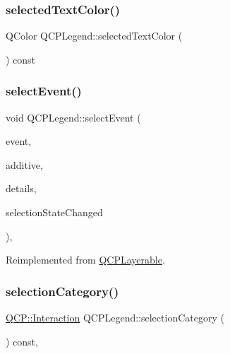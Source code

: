 \subsubsection{\texorpdfstring{selectedTextColor()}{selectedTextColor()}}
{\footnotesize\ttfamily Q\+Color Q\+C\+P\+Legend\+::selected\+Text\+Color (\begin{DoxyParamCaption}{ }\end{DoxyParamCaption}) const\hspace{0.3cm}{\ttfamily [inline]}}

\mbox{\label{class_q_c_p_legend_a71f54a05c3e5b1a1ade1864422cd642e}} 
\subsubsection{\texorpdfstring{selectEvent()}{selectEvent()}}
{\footnotesize\ttfamily void Q\+C\+P\+Legend\+::select\+Event (\begin{DoxyParamCaption}\item[{Q\+Mouse\+Event $\ast$}]{event,  }\item[{bool}]{additive,  }\item[{const Q\+Variant \&}]{details,  }\item[{bool $\ast$}]{selection\+State\+Changed }\end{DoxyParamCaption})\hspace{0.3cm}{\ttfamily [protected]}, {\ttfamily [virtual]}}



Reimplemented from \mbox{\hyperlink{class_q_c_p_layerable_a7498c2d0d081cf7cad0fb3bb93aa0e91}{Q\+C\+P\+Layerable}}.

\mbox{\label{class_q_c_p_legend_a1a2075e462984f9ff51d9c75bda3581b}} 
\subsubsection{\texorpdfstring{selectionCategory()}{selectionCategory()}}
{\footnotesize\ttfamily \mbox{\hyperlink{namespace_q_c_p_a2ad6bb6281c7c2d593d4277b44c2b037}{Q\+C\+P\+::\+Interaction}} Q\+C\+P\+Legend\+::selection\+Category (\begin{DoxyParamCaption}{ }\end{DoxyParamCaption}) const\hspace{0.3cm}{\ttfamily [protected]}, {\ttfamily [virtual]}}



